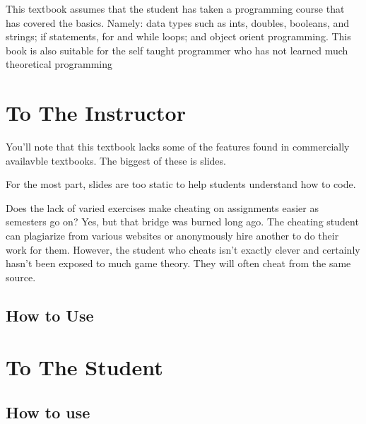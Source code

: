 This textbook assumes that the student has taken a programming course that has covered the basics.
Namely: data types such as ints, doubles, booleans, and strings; if statements, for and while loops; and object orient programming.
This book is also suitable for the self taught programmer who has not learned much theoretical programming

\section{To The Instructor}

You'll note that this textbook lacks some of the features found in commercially availavble textbooks.  The biggest of these is slides.  



For the most part, slides are too static to help students understand how to code.



Does the lack of varied exercises make cheating on assignments easier as semesters go on?  Yes, but that bridge was burned long ago.  
The cheating student can plagiarize from various websites or anonymously hire another to do their work for them.
However, the student who cheats isn't exactly clever and certainly hasn't been exposed to much game theory.  
They will often cheat from the same source.  

\subsection{How to Use}

\section{To The Student}


\subsection{How to use}



